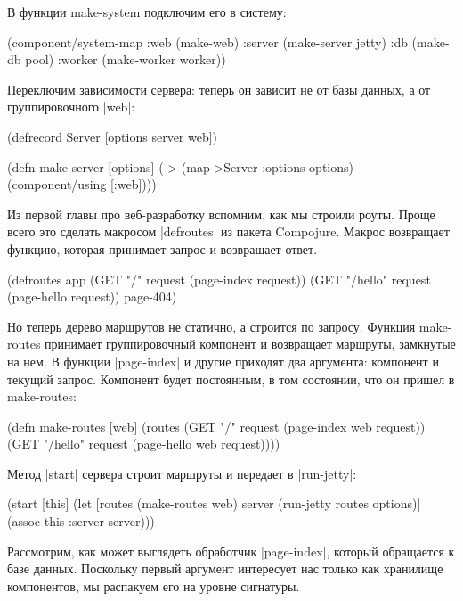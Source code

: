 В функции make-system подключим его в систему:

\begin{code}
(component/system-map
 :web    (make-web)
 :server (make-server jetty)
 :db     (make-db pool)
 :worker (make-worker worker))
\end{code}

Переключим зависимости сервера: теперь он зависит не от базы данных, а от
группировочного \spverb|web|:

\begin{code}
(defrecord Server
    [options server web])

(defn make-server
  [options]
  (-> (map->Server {:options options})
      (component/using [:web])))
\end{code}

Из первой главы про веб-разработку вспомним, как мы строили роуты. Проще всего
это сделать макросом \spverb|defroutes| из пакета Compojure. Макрос возвращает функцию,
которая принимает запрос и возвращает ответ.

\begin{code}
(defroutes app
  (GET "/"      request (page-index request))
  (GET "/hello" request (page-hello request))
  page-404)
\end{code}

Но теперь дерево маршрутов не статично, а строится по запросу. Функция
make-routes принимает группировочный компонент и возвращает маршруты, замкнутые
на нем. В функции \spverb|page-index| и другие приходят два аргумента: компонент и
текущий запрос. Компонент будет постоянным, в том состоянии, что он пришел в
make-routes:

\begin{code}
(defn make-routes [web]
  (routes
   (GET "/"      request (page-index web request))
   (GET "/hello" request (page-hello web request))))
\end{code}

Метод \spverb|start| сервера строит маршруты и передает в \spverb|run-jetty|:

\begin{code}
(start [this]
  (let [routes (make-routes web)
        server (run-jetty routes options)]
    (assoc this :server server)))
\end{code}

Рассмотрим, как может выглядеть обработчик \spverb|page-index|, который обращается к
базе данных. Поскольку первый аргумент интересует нас только как хранилище
компонентов, мы распакуем его на уровне сигнатуры.

